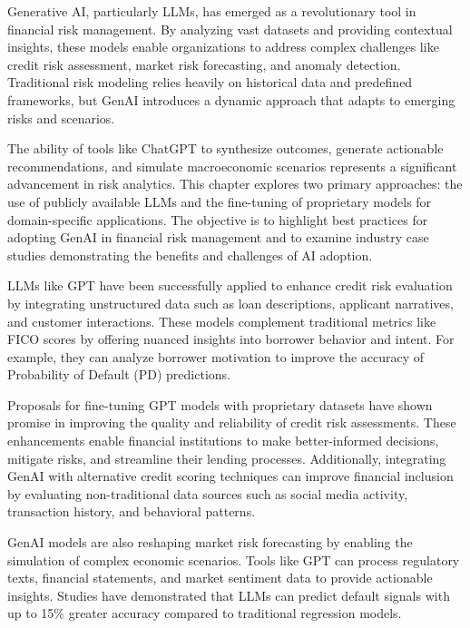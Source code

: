 \documentclass[a4paper,12pt]{scrbook}
\begin{document}
	
	Generative AI, particularly LLMs, has emerged as a revolutionary tool in financial risk management. By analyzing vast datasets and providing contextual insights, these models enable organizations to address complex challenges like credit risk assessment, market risk forecasting, and anomaly detection. Traditional risk modeling relies heavily on historical data and predefined frameworks, but GenAI introduces a dynamic approach that adapts to emerging risks and scenarios.
	
	The ability of tools like ChatGPT to synthesize outcomes, generate actionable recommendations, and simulate macroeconomic scenarios represents a significant advancement in risk analytics. This chapter explores two primary approaches: the use of publicly available LLMs and the fine-tuning of proprietary models for domain-specific applications. The objective is to highlight best practices for adopting GenAI in financial risk management and to examine industry case studies demonstrating the benefits and challenges of AI adoption.
	
	
	
	LLMs like GPT have been successfully applied to enhance credit risk evaluation by integrating unstructured data such as loan descriptions, applicant narratives, and customer interactions. These models complement traditional metrics like FICO scores by offering nuanced insights into borrower behavior and intent. For example, they can analyze borrower motivation to improve the accuracy of Probability of Default (PD) predictions.
	
	Proposals for fine-tuning GPT models with proprietary datasets have shown promise in improving the quality and reliability of credit risk assessments. These enhancements enable financial institutions to make better-informed decisions, mitigate risks, and streamline their lending processes. Additionally, integrating GenAI with alternative credit scoring techniques can improve financial inclusion by evaluating non-traditional data sources such as social media activity, transaction history, and behavioral patterns.
	
	
	GenAI models are also reshaping market risk forecasting by enabling the simulation of complex economic scenarios. Tools like GPT can process regulatory texts, financial statements, and market sentiment data to provide actionable insights. Studies have demonstrated that LLMs can predict default signals with up to 15\% greater accuracy compared to traditional regression models.
	
\end{document}
